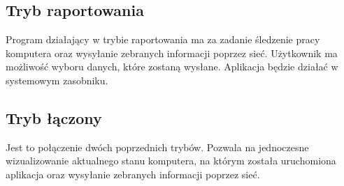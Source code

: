 \documentclass[a4paper]{article}
\begin{document}
	\subsection{Tryb raportowania}
		Program działający w trybie raportowania ma za zadanie śledzenie pracy komputera oraz wysyłanie zebranych informacji poprzez sieć. Użytkownik ma możliwość wyboru danych, które zostaną wysłane. Aplikacja będzie działać w systemowym zasobniku.
	
	\subsection{Tryb łączony}
		Jest to połączenie dwóch poprzednich trybów. Pozwala na jednoczesne wizualizowanie aktualnego stanu komputera, na którym została uruchomiona aplikacja oraz wysyłanie zebranych informacji poprzez sieć.
	
	
\end{document}
